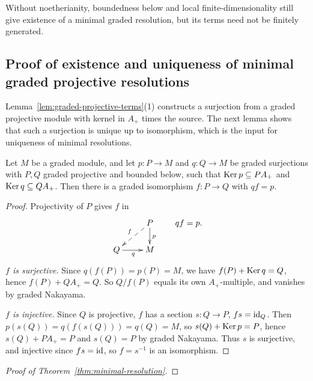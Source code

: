Without noetherianity, boundedness below and local finite-dimensionality still give existence of a minimal graded resolution, but its terms need not be finitely generated.

\begin{supplementary}
\subsection{Proof of existence and uniqueness of minimal graded projective resolutions}\label{subsec:ordinary-covers}

Lemma~\ref{lem:graded-projective-terms}(1) constructs a surjection from a graded projective module with kernel in $A_+$ times the source.
The next lemma shows that such a surjection is unique up to isomorphism, which is the input for uniqueness of minimal resolutions.

\begin{lemma}\label{lem:graded-top-uniqueness}
Let $M$ be a graded module, and let $p:P\to M$ and $q:Q\to M$ be graded surjections with $P,Q$ graded projective and bounded below, such that $\operatorname{Ker}\nolimits p\subseteq PA_+$ and $\operatorname{Ker}\nolimits q\subseteq QA_+$.
Then there is a graded isomorphism $f:P\to Q$ with $qf=p$.
\end{lemma}

\begin{proof}
Projectivity of $P$ gives $f$ in
\[
\xymatrix@R=18pt{
& P\ar[d]^p\ar@{-->}[dl]_f\\
Q\ar[r]_q & M
}
\qquad qf=p.
\]
\emph{$f$ is surjective.}
Since $q(f(P))=p(P)=M$, we have $f(P)+\operatorname{Ker}\nolimits q=Q$, hence $f(P)+QA_+=Q$.
So $Q/f(P)$ equals its own $A_+$-multiple, and vanishes by graded Nakayama.

\emph{$f$ is injective.}
Since $Q$ is projective, $f$ has a section $s:Q\to P$, $fs=\operatorname{id}_Q$.
Then $p(s(Q))=q(f(s(Q)))=q(Q)=M$, so $s(Q)+\operatorname{Ker}\nolimits p=P$, hence $s(Q)+PA_+=P$ and $s(Q)=P$ by graded Nakayama.
Thus $s$ is surjective, and injective since $fs=\operatorname{id}$, so $f=s^{-1}$ is an isomorphism.
\end{proof}

\begin{proof}[Proof of Theorem~\ref{thm:minimal-resolution}]


\end{proof}
\end{supplementary}
